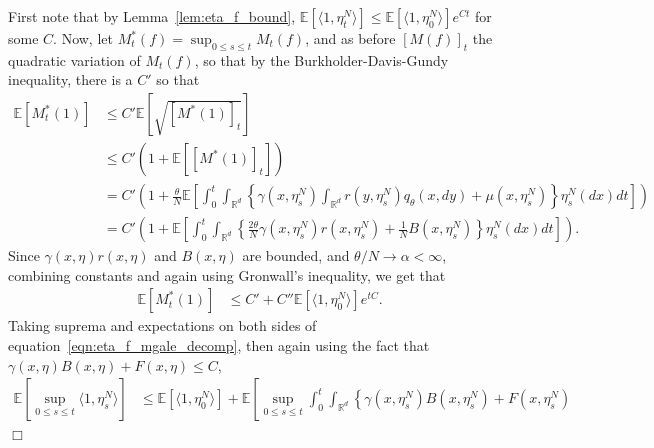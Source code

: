 \documentclass[12pt]{article}
\newenvironment {proof}{{\noindent\bf Proof }}{\hfill $\Box$ \medskip}
\newcommand{\IE}{\mathbb E}
\newcommand{\IR}{\mathbb R}
\begin{document}
\begin{proof}
    First note that by Lemma~\ref{lem:eta_f_bound},
    $\IE[\langle 1, \eta^N_t \rangle] \le \IE[\langle 1, \eta^N_0 \rangle] e^{Ct}$
    for some $C$.
    Now, let $M^*_t(f) = \sup_{0 \le s \le t} M_t(f)$,
    and as before $[M(f)]_t$ the quadratic variation of $M_t(f)$,
    so that by the Burkholder-Davis-Gundy inequality, there is a $C'$ so that
    \begin{align*}
        \IE\left[ M^*_t(1) \right]
        &\le
        C' \IE\left[ \sqrt{[M^*(1)]_t} \right]
        \\ &\le
        C'\left( 1 + \IE\left[ [M^*(1)]_t \right] \right)
        \\ &=
        C'\left( 1 + \frac{\theta}{N} \IE\left[
            \int_0^t
            \int_{\IR^d} \left\{
                \gamma(x, \eta^N_s)
                \int_{\IR^d} r(y, \eta^N_s) q_\theta(x, dy)
                + \mu(x, \eta^N_s)
            \right\} \eta_s^N(dx)
            dt
            \right] \right)
        \\ &=
        C'\left( 1 + \IE\left[
            \int_0^t
            \int_{\IR^d} \left\{
                \frac{2\theta}{N} \gamma(x, \eta^N_s) r(x, \eta^N_s)
                + \frac{1}{N} B(x, \eta^N_s)
            \right\} \eta_s^N(dx)
            dt
            \right] \right) .
    \end{align*}
    Since $\gamma(x, \eta) r(x, \eta)$ and $B(x, \eta)$ are bounded,
    and $\theta/N \to \alpha < \infty$,
    combining constants and again using Gronwall's inequality, we get that
    \begin{align*}
        \IE\left[ M^*_t(1) \right]
        &\le
        C' + C'' \IE[ \langle 1, \eta_0^N \rangle ] e^{tC} .
    \end{align*}
    Taking suprema and expectations on both sides of equation~\eqref{eqn:eta_f_mgale_decomp},
    then again using the fact that $\gamma(x, \eta) B(x, \eta) + F(x, \eta) \le C$,
    \begin{align*}
        \IE\left[\sup_{0 \le s \le t} \langle 1, \eta^N_s \rangle \right]
        &\le
        \IE[\langle 1, \eta^N_0 \rangle]
        + \IE\left[
            \sup_{0 \le s \le t}
            \int_0^t \int_{\IR^d} \left\{
                \gamma(x, \eta^N_s)
                B(x, \eta^N_s)
                + F(x, \eta^N_s)

\end{align*}
\end{proof}
\end{document}
